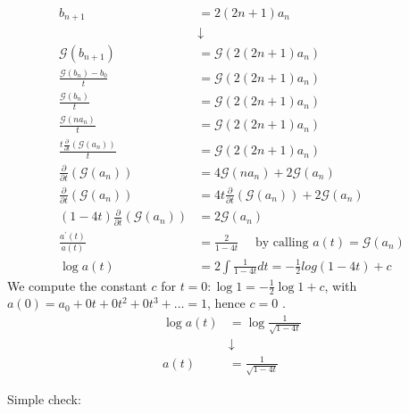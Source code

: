 \begin{displaymath}
  \begin{split}
    b_{n+1} &= 2(2n + 1)a_n \\
    &\downarrow \\
    \mathcal{G} (b_{n+1}) &= \mathcal{G} (2(2n+1)a_n)\\
    \frac{\mathcal{G} (b_n) - b_0}{t} &= \mathcal{G} (2(2n+1)a_n)\\
    \frac{\mathcal{G} (b_n)}{t} &= \mathcal{G} (2(2n+1)a_n)\\
    \frac{\mathcal{G} (n a_n)}{t} &= \mathcal{G} (2(2n+1)a_n)\\
    \frac{t\frac{\partial}{\partial t}\left( \mathcal{G} (a_n)
      \right) }{t} &= \mathcal{G} (2(2n+1)a_n)\\
    \frac{\partial}{\partial t}\left( \mathcal{G} (a_n) \right) &=
    4\mathcal{G} (n a_n) + 2\mathcal{G} (a_n)\\
    \frac{\partial}{\partial t}\left( \mathcal{G} (a_n) \right) &= 4 t
    \frac{\partial}{\partial t}\left(
      \mathcal{G} (a_n) \right) + 2\mathcal{G} (a_n)\\
    (1-4t)\frac{\partial}{\partial t}\left( \mathcal{G} (a_n) \right)
    &=    2\mathcal{G} (a_n) \\
    \frac{a^\prime(t)}{a(t)} &= \frac{2}{1-4t} \quad \text{ by calling
    }
    a(t) = \mathcal{G} (a_n)\\
    \log a(t) &= 2\int{ \frac{1}{1-4t}dt} = - \frac{1}{2} log{(1-4t)}
    + c
  \end{split}
\end{displaymath}
We compute the constant $c$ for $t=0: \log 1 = - \frac{1}{2} \log 1 +
c$, with $a(0) = a_0 + 0t+0t^2 + 0t^3+\ldots = 1$, hence $c=0$ .
\begin{displaymath}
  \begin{split}
    \log{a(t)} &= \log{\frac{1}{\sqrt{1-4t}}}\\
    &\downarrow \\
    a(t) &= \frac{1}{\sqrt{1-4t}}
  \end{split}
\end{displaymath}

Simple check:


